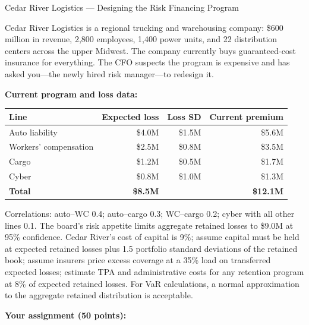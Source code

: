 \documentclass[11pt,openany]{book}
\begin{document}
\begin{minicase}{Cedar River Logistics --- Designing the Risk Financing
Program}

Cedar River Logistics is a regional trucking and warehousing company: \$600
million in revenue, 2,800 employees, 1,400 power units, and 22 distribution
centers across the upper Midwest. The company currently buys guaranteed-cost
insurance for everything. The CFO suspects the program is expensive and has
asked you---the newly hired risk manager---to redesign it.

\textbf{Current program and loss data:}

\begin{center}
\begin{tabular}{@{}lrrr@{}}
\toprule
\textbf{Line} & \textbf{Expected loss} & \textbf{Loss SD} &
\textbf{Current premium} \\
\midrule
Auto liability & \$4.0M & \$1.5M & \$5.6M \\
Workers' compensation & \$2.5M & \$0.8M & \$3.5M \\
Cargo & \$1.2M & \$0.5M & \$1.7M \\
Cyber & \$0.8M & \$1.0M & \$1.3M \\
\midrule
\textbf{Total} & \textbf{\$8.5M} & & \textbf{\$12.1M} \\
\bottomrule
\end{tabular}
\end{center}

Correlations: auto--WC 0.4; auto--cargo 0.3; WC--cargo 0.2; cyber with all
other lines 0.1. The board's risk appetite limits aggregate retained losses
to \$9.0M at 95\% confidence. Cedar River's cost of capital is 9\%; assume
capital must be held at expected retained losses plus 1.5 portfolio standard
deviations of the retained book; assume insurers price excess coverage at a
35\% load on transferred expected losses; estimate TPA and administrative
costs for any retention program at 8\% of expected retained losses. For VaR
calculations, a normal approximation to the aggregate retained distribution
is acceptable.

\textbf{Your assignment (50 points):}


\end{minicase}
\end{document}
